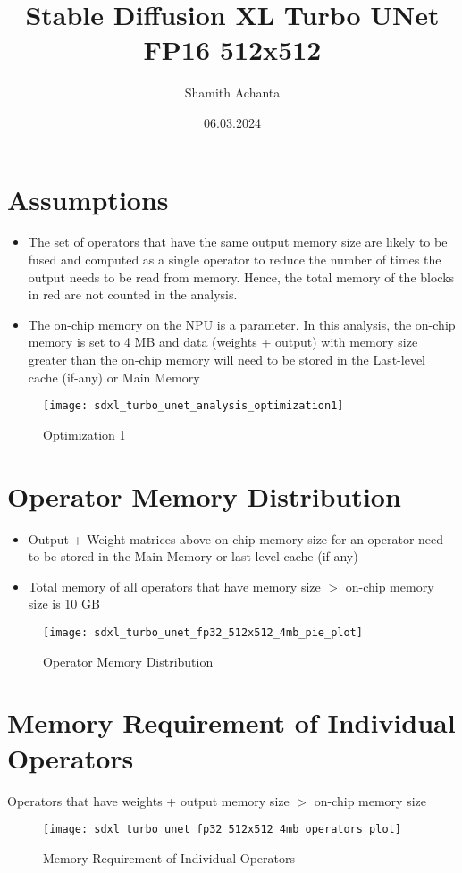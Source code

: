 \documentclass[12pt]{article}
\begin{document}
\title{Stable Diffusion XL Turbo UNet FP16 512x512}
\author{Shamith Achanta}
\date{06.03.2024}

\maketitle

\section{Assumptions}
\begin{itemize}
	\item The set of operators that have the same output memory size are likely to be fused and computed as a single operator to reduce the number of times the output needs to be read from memory. Hence, the total memory of the blocks in red are not counted in the analysis.
	\item The on-chip memory on the NPU is a parameter. In this analysis, the on-chip memory is set to 4 MB and data (weights + output) with memory size greater than the on-chip memory will need to be stored in the Last-level cache (if-any) or Main Memory
\end{itemize}

\begin{figure}[h]
\caption{Optimization 1}
\centering
\texttt{[image: sdxl\_turbo\_unet\_analysis\_optimization1]}
\end{figure}

\clearpage

\section{Operator Memory Distribution}
\begin{itemize}
	\item Output + Weight matrices above on-chip memory size for an operator need to be stored in the Main Memory or last-level cache (if-any)
	\item Total memory of all operators that have memory size $>$ on-chip memory size is 10 GB
\end{itemize}

\begin{figure}[h]
\caption{Operator Memory Distribution}
\centering
\texttt{[image: sdxl\_turbo\_unet\_fp32\_512x512\_4mb\_pie\_plot]}
\end{figure}

\clearpage

\section{Memory Requirement of Individual Operators}
Operators that have weights + output memory size $>$ on-chip memory size

\begin{figure}[h]
\caption{Memory Requirement of Individual Operators}
\centering
\texttt{[image: sdxl\_turbo\_unet\_fp32\_512x512\_4mb\_operators\_plot]}
\end{figure}

\clearpage
\end{document}
